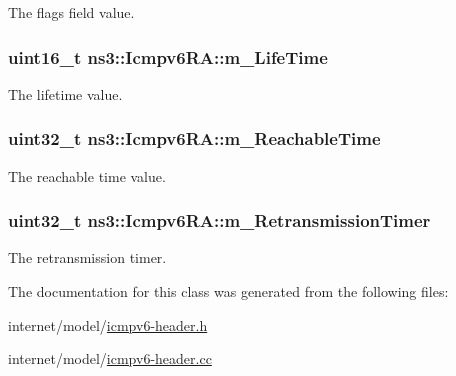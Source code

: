 The flags field value. 

\subsubsection[{\texorpdfstring{m\+\_\+\+Life\+Time}{m_LifeTime}}]{\setlength{\rightskip}{0pt plus 5cm}uint16\+\_\+t ns3\+::\+Icmpv6\+R\+A\+::m\+\_\+\+Life\+Time\hspace{0.3cm}{\ttfamily [private]}}\hypertarget{classns3_1_1Icmpv6RA_aaafb2d6c2bd83baa13add360d9afd0f5}{}\label{classns3_1_1Icmpv6RA_aaafb2d6c2bd83baa13add360d9afd0f5}


The lifetime value. 

\subsubsection[{\texorpdfstring{m\+\_\+\+Reachable\+Time}{m_ReachableTime}}]{\setlength{\rightskip}{0pt plus 5cm}uint32\+\_\+t ns3\+::\+Icmpv6\+R\+A\+::m\+\_\+\+Reachable\+Time\hspace{0.3cm}{\ttfamily [private]}}\hypertarget{classns3_1_1Icmpv6RA_adb771ec3d6a283e55d3ac133cfb28f91}{}\label{classns3_1_1Icmpv6RA_adb771ec3d6a283e55d3ac133cfb28f91}


The reachable time value. 

\subsubsection[{\texorpdfstring{m\+\_\+\+Retransmission\+Timer}{m_RetransmissionTimer}}]{\setlength{\rightskip}{0pt plus 5cm}uint32\+\_\+t ns3\+::\+Icmpv6\+R\+A\+::m\+\_\+\+Retransmission\+Timer\hspace{0.3cm}{\ttfamily [private]}}\hypertarget{classns3_1_1Icmpv6RA_a920c069e9bd468d9f37ea19e59ea9abc}{}\label{classns3_1_1Icmpv6RA_a920c069e9bd468d9f37ea19e59ea9abc}


The retransmission timer. 



The documentation for this class was generated from the following files\+:\begin{DoxyCompactItemize}
\item 
internet/model/\hyperlink{icmpv6-header_8h}{icmpv6-\/header.\+h}\item 
internet/model/\hyperlink{icmpv6-header_8cc}{icmpv6-\/header.\+cc}\end{DoxyCompactItemize}
